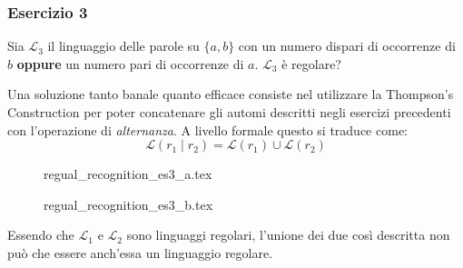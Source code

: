 \documentclass[class=book, crop=false, oneside, 12pt]{standalone}
\begin{document}
\subsubsection{Esercizio 3}
\label{subsubsec:ex3}
Sia \(\mathcal{L}_3\) il linguaggio delle parole su \(\{a, b\}\) con un numero dispari di occorrenze di \(b\) \textbf{oppure} un numero pari di occorrenze di \(a\). \(\mathcal{L}_3\) è regolare?

Una soluzione tanto banale quanto efficace consiste nel utilizzare la Thompson's Construction per poter concatenare gli automi descritti negli esercizi precedenti con l'operazione di \emph{alternanza}. A livello formale questo si traduce come:
\begin{equation*}
    \mathcal{L}(r_1 \mid r_2) = \mathcal{L}(r_1) \cup \mathcal{L}(r_2)
\end{equation*}
\begin{figure}[H]
    \begin{minipage}[b]{0.4\textwidth}
        \centering
        {regual_recognition_es3_a.tex}
        \label{nfa-b_odd-or-a_even}
    \end{minipage}
    \hfill
    \begin{minipage}[b]{0.4\textwidth}
        \centering
        {regual_recognition_es3_b.tex}
        \label{dfa-b_odd-or-a_even}
    \end{minipage}
    \caption{}
\end{figure}
Essendo che \(\mathcal{L}_1\) e \(\mathcal{L}_2\) sono linguaggi regolari, l'unione dei due così descritta non può che essere anch'essa un linguaggio regolare.
\end{document}
